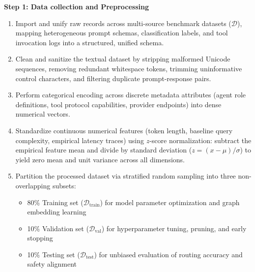 \documentclass[11pt,a4paper]{article}
\begin{document}
\vspace{0.35em}
\textbf{Step 1: Data collection and Preprocessing}
\begin{enumerate}[leftmargin=1.8em, itemsep=0.22em, topsep=0.06em]
    \item Import and unify raw records across multi-source benchmark datasets ($\mathcal{D}$), mapping heterogeneous prompt schemas, classification labels, and tool invocation logs into a structured, unified schema.
    \item Clean and sanitize the textual dataset by stripping malformed Unicode sequences, removing redundant whitespace tokens, trimming uninformative control characters, and filtering duplicate prompt-response pairs.
    \item Perform categorical encoding across discrete metadata attributes (agent role definitions, tool protocol capabilities, provider endpoints) into dense numerical vectors.
    \item Standardize continuous numerical features (token length, baseline query complexity, empirical latency traces) using $z$-score normalization: subtract the empirical feature mean and divide by standard deviation ($z = (x - \mu)/\sigma$) to yield zero mean and unit variance across all dimensions.
    \item Partition the processed dataset via stratified random sampling into three non-overlapping subsets:
    \begin{itemize}[leftmargin=1.5em, itemsep=0.08em, topsep=0.04em, label=$\ast$]
        \item 80\% Training set ($\mathcal{D}_{\text{train}}$) for model parameter optimization and graph embedding learning
        \item 10\% Validation set ($\mathcal{D}_{\text{val}}$) for hyperparameter tuning, pruning, and early stopping
        \item 10\% Testing set ($\mathcal{D}_{\text{test}}$) for unbiased evaluation of routing accuracy and safety alignment
    \end{itemize}
\end{enumerate}

\newpage

\end{document}
